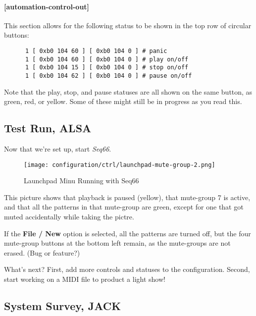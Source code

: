 \paragraph{[automation-control-out]}
\label{paragraph:patterns_automation_control_out}

   This section allows for the following status to be shown in the top row of
   circular buttons:

   \begin{verbatim}
      1 [ 0xb0 104 60 ] [ 0xb0 104 0 ] # panic
      1 [ 0xb0 104 60 ] [ 0xb0 104 0 ] # play on/off
      1 [ 0xb0 104 15 ] [ 0xb0 104 0 ] # stop on/off
      1 [ 0xb0 104 62 ] [ 0xb0 104 0 ] # pause on/off
   \end{verbatim}

   Note that the play, stop, and pause statuses are all shown on the same
   button, as green, red, or yellow.  Some of these might still be in progress
   as you read this.

\subsection{Test Run, ALSA}
\label{subsubsec:launchpad_mini_test_run_alsa}

   Now that we're set up, start \textsl{Seq66}.

\begin{figure}[H]
   \centering 
   \texttt{[image: configuration/ctrl/launchpad-mute-group-2.png]}
   \caption{Launchpad Minu Running with Seq66}
   \label{fig:launchpad_mute_group_perspective}
\end{figure}

   This picture shows that playback is paused (yellow), that mute-group 7 is
   active, and that all the patterns in that mute-group are green, except for one
   that got muted accidentally while taking the pictre.

   If the \textbf{File / New} option is selected, all the patterns are turned off,
   but the four mute-group buttons at the bottom left remain, as the mute-groups
   are not erased.  (Bug or feature?)

   What's next?  First, add more controls and statuses to the configuration.
   Second, start working on a MIDI file to product a light show!

\subsection{System Survey, JACK}
\label{subsec:launchpad_mini_survey_jack}

